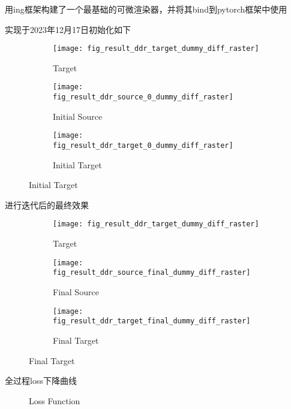 用ing框架构建了一个最基础的可微渲染器，并将其bind到pytorch框架中使用

实现于2023年12月17日初始化如下

\begin{figure}[H]
    \centering
        \begin{subfigure}{0.3\linewidth}
            \texttt{[image: fig\_result\_ddr\_target\_dummy\_diff\_raster]}
            \caption{Target}
        \end{subfigure}
        \begin{subfigure}{0.3\linewidth}
            \texttt{[image: fig\_result\_ddr\_source\_0\_dummy\_diff\_raster]}
            \caption{Initial Source}
        \end{subfigure}
        \begin{subfigure}{0.3\linewidth}
            \texttt{[image: fig\_result\_ddr\_target\_0\_dummy\_diff\_raster]}
            \caption{Initial Target}
        \end{subfigure}
\end{figure}

进行迭代后的最终效果

\begin{figure}[H]
    \centering
        \begin{subfigure}{0.3\linewidth}
            \texttt{[image: fig\_result\_ddr\_target\_dummy\_diff\_raster]}
            \caption{Target}
        \end{subfigure}
        \begin{subfigure}{0.3\linewidth}
            \texttt{[image: fig\_result\_ddr\_source\_final\_dummy\_diff\_raster]}
            \caption{Final Source}
        \end{subfigure}
        \begin{subfigure}{0.3\linewidth}
            \texttt{[image: fig\_result\_ddr\_target\_final\_dummy\_diff\_raster]}
            \caption{Final Target}
        \end{subfigure}
\end{figure}

全过程loss下降曲线

\begin{figure}[H]
    
    \caption{Loss Function}
\end{figure}